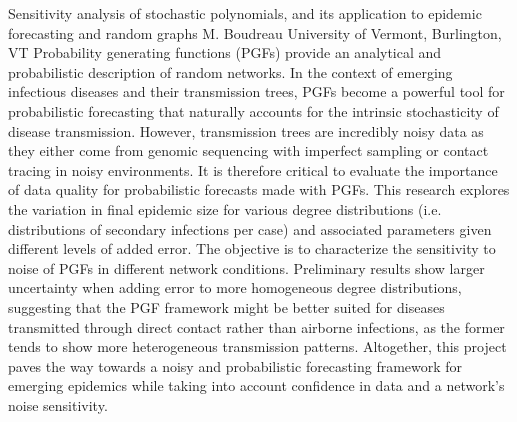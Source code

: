 
    \begin{abstract_online}{Sensitivity analysis of stochastic polynomials, and its application to epidemic forecasting and random graphs}{%
        M. Boudreau}{%
        }{%
        University of Vermont, Burlington, VT}
    Probability generating functions (PGFs) provide an analytical and probabilistic description of random networks. In the context of emerging infectious diseases and their transmission trees, PGFs become a powerful tool for probabilistic forecasting that naturally accounts for the intrinsic stochasticity of disease transmission. However, transmission trees are incredibly noisy data as they either come from genomic sequencing with imperfect sampling or contact tracing in noisy environments. It is therefore critical to evaluate the importance of data quality for probabilistic forecasts made with PGFs.  This research explores the variation in final epidemic size for various degree distributions (i.e. distributions of secondary infections per case)  and associated parameters given different levels of added error. The objective is to characterize the sensitivity to noise of PGFs in different network conditions. Preliminary results show larger uncertainty when adding error to more homogeneous degree distributions, suggesting that the PGF framework might be better suited for diseases transmitted through direct contact rather than airborne infections, as the former tends to show more heterogeneous transmission patterns. Altogether, this project paves the way towards a noisy and probabilistic forecasting framework for emerging epidemics while taking into account confidence in data and a network’s noise sensitivity. 
    
    \end{abstract_online}
    